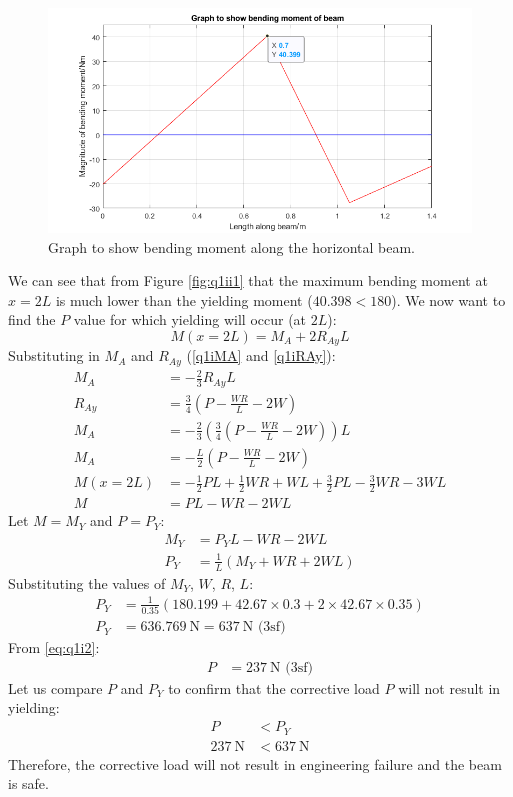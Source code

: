 \documentclass[11pt]{article}
\numberwithin{equation}{section}
\begin{document}
\begin{figure}[H]
    \centering
    \includegraphics[width = \textwidth]{./img/q1iii2.png}
    \caption{Graph to show bending moment along the horizontal beam.}
    \label{fig:q1iii}
\end{figure}
We can see that from Figure \ref{fig:q1ii1} that the maximum bending moment at $x =2L$ is much lower than the yielding moment ($40.398<180$). We now want to find the $P$ value for which yielding will occur (at $2L$):
\begin{equation}
    M(x = 2L) = M_A + 2R_{Ay}L
\end{equation}
Substituting in $M_A$ and $R_{Ay}$ (\ref{q1iMA} and \ref{q1iRAy}):
\begin{align}
    M_A &= -\frac{2}{3}R_{Ay}L\\
    R_{Ay} &= \frac{3}{4}\left(P - \frac{WR}{L}-2W\right)\\
    M_A &= -\frac{2}{3}\left(\frac{3}{4}\left(P - \frac{WR}{L}-2W\right)\right)L\\
    M_A &= -\frac{L}{2} \left(P - \frac{WR}{L}-2W\right)\\
    M(x=2L) &= -\frac{1}{2}PL + \frac{1}{2}WR + WL + \frac{3}{2}PL - \frac{3}{2}WR - 3WL\\
    M &= PL - WR - 2WL
\end{align}
Let $M = M_Y$ and $P = P_Y$:
\begin{align}
    M_Y &= P_Y L - WR - 2WL\\
    P_Y &= \frac{1}{L}\left(M_Y + WR + 2WL\right)
\end{align}
Substituting the values of $M_Y$, $W$, $R$, $L$:
\begin{align}
    P_Y &= \frac{1}{0.35}\left(180.199+ 42.67\times 0.3 + 2\times 42.67 \times 0.35\right)\\
    P_Y &= \SI{636.769}{\newton} = \SI{637}{\newton} \textrm{ (3sf)}
\end{align}
From \ref{eq:q1i2}:
\begin{align}
    P &= \SI{237}{\newton} \textrm{ (3sf)}
\end{align}
Let us compare $P$ and $P_Y$ to confirm that the corrective load $P$ will not result in yielding:
\begin{align}
    P &< P_Y\\
    \SI{237}{\newton} &< \SI{637}{\newton}
\end{align}
Therefore, the corrective load will not result in engineering failure and the beam is safe.
\end{document}
